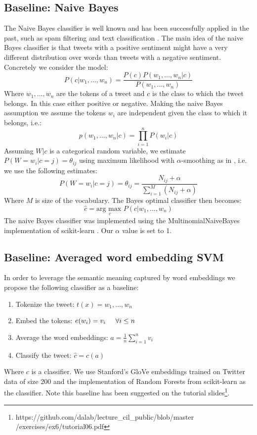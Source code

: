 \documentclass[conference]{IEEEtran}
\newcommand{\Glove}{GloVe }
\begin{document}
\subsection{Baseline: Naive Bayes}
The Naive Bayes classifier is well known and has been successfully applied in the past, such as spam filtering and text classification \cite{NB_SPAM, NB_SAL}. The main idea of the naive Bayes classifier is that tweets with a positive sentiment might have a very different distribution over words than tweets with a negative sentiment. Concretely we consider the model:	
	\begin{equation}
		P(c|w_1, \dots, w_n) = \frac{P(c)P(w_1, \dots, w_n|c)}{P(w_1,\dots,w_n)}
	\end{equation}
	Where $w_1, \dots, w_n$ are the tokens of a tweet and $c$ is the class to which the tweet belongs. In this case either positive or negative. Making the naive Bayes assumption we assume the tokens $w_i$ are independent given the class to which it belongs, i.e.:
	\begin{equation}
	p(w_1, \dots, w_n|c) = \prod_{i=1}^{n}P(w_i|c)
	\end{equation}
	Assuming $W|c$ is a categorical random variable, we estimate $P(W=w_i|c=j) = \theta_{ij}$ using maximum likelihood with $\alpha$-smoothing as in \cite{NB_SAL}, i.e. we use the following estimates:
	\begin{equation}
		P(W=w_i|c=j) = \hat{\theta}_{ij} = \frac{N_{ij} + \alpha}{\sum_{i=1}^{M}(N_{ij} + \alpha) }
	\end{equation}
	Where $M$ is size of the vocabulary. The Bayes optimal classifier then becomes:
    \begin{equation}
    	\hat{c} = \underset{c}{\text{arg max }} P(c|w_1, \dots, w_n)
    \end{equation}
    The naive Bayes classifier was implemented using the MultinomialNaiveBayes implementation of scikit-learn \cite{sklearn}. Our $\alpha$ value is set to 1.
	
\subsection{Baseline: Averaged word embedding SVM} In order to leverage the semantic meaning captured by word embeddings we propose the following classifier as a baseline:
		\begin{enumerate}
			\item Tokenize the tweet: $t(x) = w_1, \dots, w_n$
			\item Embed the tokens: $e(w_i) = v_i \hspace{0.5 cm} \forall i \leq n$
			\item Average the word embeddings: $a = \frac{1}{n}\sum_{i=1}^{n}v_i$
			\item Classify the tweet: $\hat{c} = c(a)$
		\end{enumerate}
		Where $c$ is a classifier. We use Stanford's \Glove embeddings trained on Twitter data \cite{GLOVE} of size 200 and the implementation of Random Forests from scikit-learn \cite{sklearn} as the classifier. Note this baseline has been suggested on the tutorial slides\footnote{https://github.com/dalab/lecture\_cil\_public/blob/master\\/exercises/ex6/tutorial06.pdf}.
\end{document}
